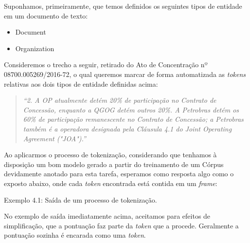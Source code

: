 \documentclass[11pt]{report}
\newcommand{\quotes}[1]{``#1''}
\begin{document}
Suponhamos, primeiramente, que temos definidos os seguintes tipos de entidade em um documento de texto:

\begin{itemize}
  \item Document
  \item Organization
\end{itemize}

Consideremos o trecho a seguir, retirado do Ato de Concentração nº 08700.005269/2016-72, o qual queremos marcar de forma automatizada as \textit{tokens} relativas
aos dois tipos de entidade definidas acima:

\begin{quote}
  \textit{\quotes{2. A OP atualmente detém 20\% de participação no Contrato de Concessão, enquanto a QGOG detém outros 20\%.
  A Petrobras detém os 60\% de participação remanescente no Contrato de Concessão; a Petrobras também é a operadora designada
  pela Cláusula 4.1 do Joint Operating Agreement ("JOA").}}
\end{quote}

Ao aplicarmos o processo de tokenização, considerando que tenhamos à disposição um bom modelo gerado a partir do treinamento de um Córpus devidamente anotado para esta tarefa,
esperamos como resposta algo como o exposto abaixo, onde cada \textit{token} encontrada está contida em um \textit{frame}:

\begin{quote}
             
       
              
       
         
\end{quote}
\begin{center}
  Exemplo 4.1: Saída de um processo de tokenização.
\end{center}

No exemplo de saída imediatamente acima, aceitamos para efeitos de simplificação, que a pontuação faz parte da \textit{token} que a procede.
Geralmente a pontuação sozinha é encarada como uma \textit{token}.
\end{document}

